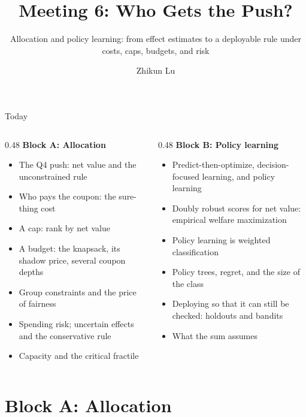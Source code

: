 \documentclass[aspectratio=169, 11pt, handout]{beamer}
\title[Meeting 6]{Meeting 6: Who Gets the Push?}
\subtitle{Allocation and policy learning: from effect estimates to a deployable rule under costs, caps, budgets, and risk}
\author{Zhikun Lu}
\date{}
\begin{document}
\begin{frame}
\titlepage
\end{frame}

\begin{frame}{Today}

\begin{columns}[T]
\begin{column}{0.48\textwidth}
\textbf{Block A: Allocation}
\begin{itemize}
  \item The Q4 push: net value and the unconstrained rule
  \item Who pays the coupon: the sure-thing cost
  \item A cap: rank by net value
  \item A budget: the knapsack, its shadow price, several coupon depths
  \item Group constraints and the price of fairness
  \item Spending risk; uncertain effects and the conservative rule
  \item Capacity and the critical fractile
\end{itemize}
\end{column}
\begin{column}{0.48\textwidth}
\textbf{Block B: Policy learning}
\begin{itemize}
  \item Predict-then-optimize, decision-focused learning, and policy learning
  \item Doubly robust scores for net value: empirical welfare maximization
  \item Policy learning is weighted classification
  \item Policy trees, regret, and the size of the class
  \item Deploying so that it can still be checked: holdouts and bandits
  \item What the sum assumes
\end{itemize}
\end{column}
\end{columns}
\end{frame}

\section{Block A: Allocation}
\end{document}
